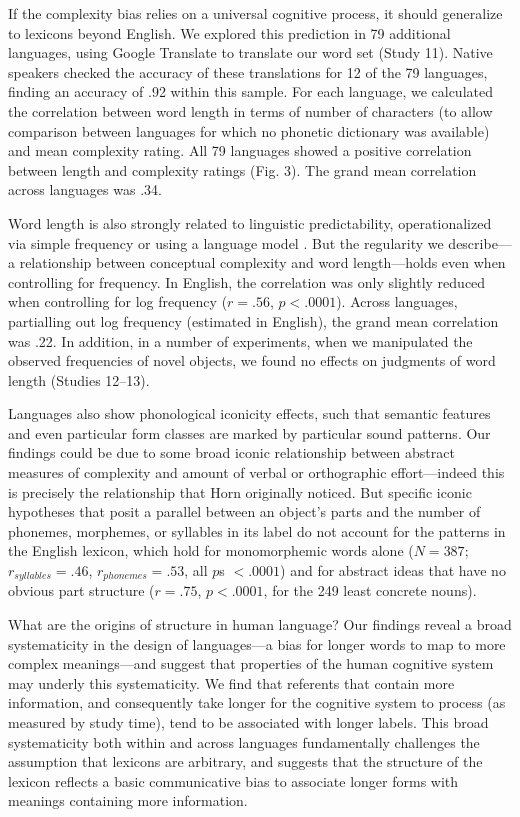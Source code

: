 \documentclass[12pt]{article}
\begin{document}
If the complexity bias relies on a universal cognitive process, it should generalize to lexicons beyond English. We explored this prediction in 79 additional languages, using Google Translate to translate our word set (Study 11). Native speakers checked the accuracy of these translations for 12 of the 79 languages, finding an accuracy of .92 within this sample. For each language, we calculated the correlation between word length in terms of number of characters (to allow comparison between languages for which no phonetic dictionary was available) and mean complexity rating. All 79 languages showed a positive correlation between length and complexity ratings (Fig. 3). The grand mean correlation across languages was .34. 
					
Word length is also strongly related to linguistic predictability, operationalized via simple frequency \cite{zipf1936} or using a language model \cite{piantadosi2011a}. But the regularity we describe---a relationship between conceptual complexity and word length---holds even when controlling for frequency. In English, the correlation was only slightly reduced when controlling for log frequency ($r = .56$, $p < .0001$). Across languages, partialling out log frequency (estimated in English), the grand mean correlation was .22. In addition, in a number of experiments, when we manipulated the observed frequencies of novel objects, we found no effects on judgments of word length (Studies 12--13). 

Languages also show phonological iconicity effects, such that semantic features \cite{maurer2006shape} and even particular form classes \cite{farmer2006phonological} are marked by particular sound patterns. Our findings could be due to some broad iconic relationship between abstract measures of complexity and amount of verbal or orthographic effort---indeed this is precisely the relationship that Horn originally noticed. But specific iconic hypotheses that posit a parallel between an object's parts and the number of phonemes, morphemes, or syllables in its label do not account for the patterns in the English lexicon, which hold for monomorphemic words alone ($N = 387$; $r_{syllables} = .46$, $r_{phonemes} = .53$, all $p$s $< .0001$) and for abstract ideas that have no obvious part structure ($r = .75$, $p< .0001$, for the 249 least concrete nouns). 

What are the origins of structure in human language? Our findings reveal a broad systematicity in the design of  languages---a bias for longer words to map to more complex meanings---and suggest that properties of the human cognitive system may underly this systematicity. We find that referents that contain more information, and consequently take longer for the cognitive system to process (as measured by study time), tend to be associated with longer labels. This broad systematicity both within and across languages fundamentally challenges the assumption that lexicons are arbitrary, and suggests that the structure of the lexicon reflects a basic communicative bias to associate longer forms with meanings containing more information.
\end{document}
